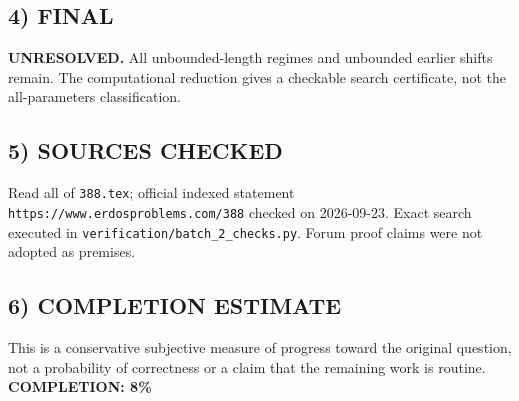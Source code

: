 \subsection{4) FINAL}
\textbf{UNRESOLVED.}
All unbounded-length regimes and unbounded earlier shifts remain. The computational reduction gives a checkable search certificate, not the all-parameters classification.
\subsection{5) SOURCES CHECKED}
Read all of \texttt{388.tex}; official indexed statement \texttt{https://www.erdosproblems.com/388} checked on 2026-09-23. Exact search executed in \texttt{verification/batch\_2\_checks.py}. Forum proof claims were not adopted as premises.
\subsection{6) COMPLETION ESTIMATE}
This is a conservative subjective measure of progress toward the original question, not a probability of correctness or a claim that the remaining work is routine.
\textbf{COMPLETION: 8\%}
